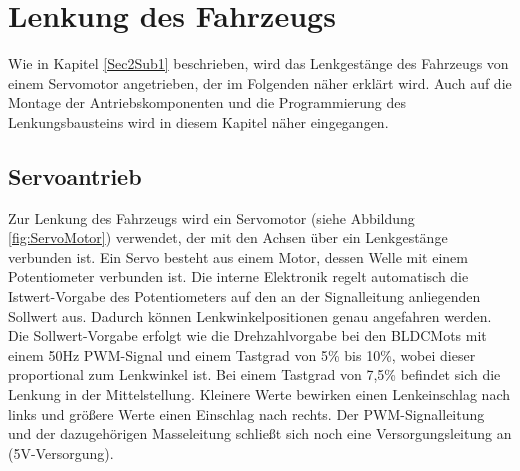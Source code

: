 

\pagestyle{fancy}
\rhead{\thepage} \chead{} 
\cfoot{}

\section{Lenkung des Fahrzeugs}\label{Sec5}

Wie in Kapitel \ref{Sec2Sub1} beschrieben, wird das Lenkgestänge des Fahrzeugs von einem Servomotor angetrieben, der im Folgenden näher erklärt wird. Auch auf die Montage der Antriebskomponenten und die Programmierung des Lenkungsbausteins wird in diesem Kapitel näher eingegangen.

\subsection{Servoantrieb}\label{Sec5Sub1}

Zur Lenkung des Fahrzeugs wird ein Servomotor (siehe Abbildung \ref{fig:ServoMotor}) verwendet, der mit den Achsen über ein Lenkgestänge verbunden ist. Ein Servo besteht aus einem Motor, dessen Welle mit einem Potentiometer verbunden ist. Die interne Elektronik regelt automatisch die Istwert-Vorgabe des Potentiometers auf den an der Signalleitung anliegenden Sollwert aus. Dadurch können Lenkwinkelpositionen genau angefahren werden. Die Sollwert-Vorgabe erfolgt wie die Drehzahlvorgabe bei den \acp{BLDCMot} mit einem 50Hz \ac{PWM}-Signal und einem Tastgrad von 5\% bis 10\%, wobei dieser proportional zum Lenkwinkel ist. Bei einem Tastgrad von 7,5\% befindet sich die Lenkung in der Mittelstellung. Kleinere Werte bewirken einen Lenkeinschlag nach links und größere Werte einen Einschlag nach rechts. Der \ac{PWM}-Signalleitung und der dazugehörigen Masseleitung schließt sich noch eine Versorgungsleitung an (5V-Versorgung).

